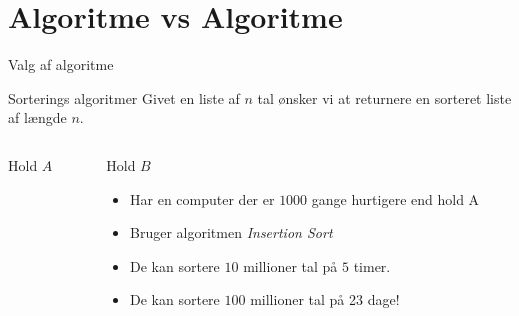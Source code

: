 \documentclass[12pt,t]{beamer}
\begin{document}
\section{Algoritme vs Algoritme}
    \begin{frame}[t]{Valg af algoritme}
        \begin{exampleblock}{Sorterings algoritmer}
            Givet en liste af $n$ tal ønsker vi at returnere en sorteret liste
            af længde $n$.
        \end{exampleblock}
        \pause
        \vspace{-2em}
        \begin{columns}
            \begin{column}{0.5\textwidth}
                \begin{block}{Hold $A$}
                    \begin{itemize}
                    \end{itemize}
                \end{block}
            \end{column}
            \begin{column}{0.5\textwidth}
                \begin{block}{Hold $B$}
                    \begin{itemize}[<+->]
                    \item Har en computer der er $1000$ gange hurtigere end
                    hold A
                    \item Bruger algoritmen \emph{Insertion Sort}
                    \item De kan sortere $10$ millioner tal på $5$ timer.
                    \item De kan sortere $100$ millioner tal på \alert{23 dage!}
                    \end{itemize}
                \end{block}
            \end{column}
        \end{columns}
    \end{frame}
\end{document}
